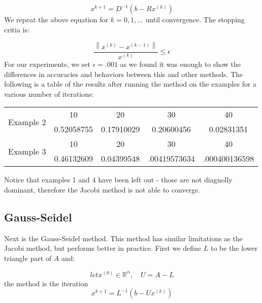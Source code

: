 \documentclass[11pt]{article}	%
\newcommand\norm[1]{\left\lVert#1\right\rVert}
\begin{document}
    \begin{equation}\label{eq:jacobi-eq-1}
        x^{k+1} = D^{-1}(b- Rx^{(k)})
    \end{equation}
    We repeat the above equation for $k = 0, 1, ...$ until convergence. The stopping critia is:

    \begin{equation}
        \frac{\norm{x^{(k)} - x^{(k-1)}}}{x^{(k)}} \leq \epsilon
    \end{equation}
    For our experiments, we set $\epsilon = .001$ as we found it was enough to show the differences in accuracies and behaviors between this and other methods. The following is a table of the results after running the method on the examples for a various number of iterations:
    \begin{center}
        \begin{tabular}{||c|c|c|c|c||}
            \hline
            \multirow{2}{5em}{Example 2} & 10 & 20 & 30 & 40 \\ [.25em]
            & 0.52058755 & 0.17910029 & 0.20600456 & 0.02831351 \\ [.25em]
            \hline \hline
            \multirow{2}{5em}{Example 3} & 10 & 20 & 30 & 40 \\ [.25em]
            & 0.46132609 & 0.04399548 & .00419573634 & .000400136598 \\ [.25em]
            \hline
        \end{tabular}
    \end{center}

    Notice that examples 1 and 4 have been left out - those are not diagnolly dominant, therefore the Jacobi method
    is not able to converge.

\subsection{Gauss-Seidel}
Next is the Gauss-Seidel method. This method has similar limitations as the Jacobi method, but performs better in practice.
First we define $L$ to be the lower triangle part of $A$ and:

\begin{equation}\label{eq:jacobi-eq-1}
    let x^{(0)}\in {\mathbb R}^n, \quad U = A - L
\end{equation}
the method is the iteration
\begin{equation}\label{eq:jacobi-eq-1}
    x^{k+1} = L^{-1}(b - Ux^{(k)})
\end{equation}
\end{document}
